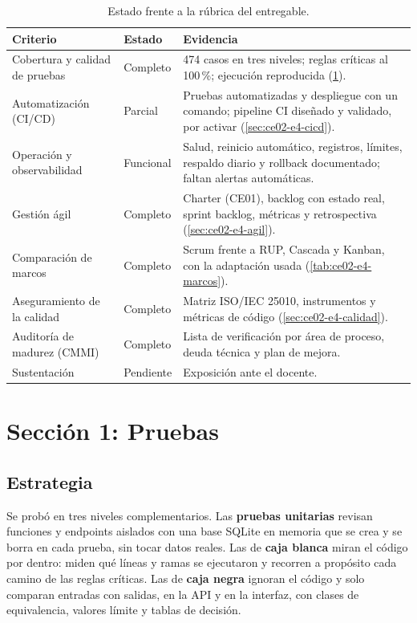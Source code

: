 \begin{table}[H]
\centering
\caption{Estado frente a la rúbrica del entregable.}
\label{tab:ce02-e4-rubrica}
\small
\begin{tabularx}{\textwidth}{L{4.2cm}L{2.2cm}X}
\toprule
\textbf{Criterio} & \textbf{Estado} & \textbf{Evidencia} \\
\midrule
Cobertura y calidad de pruebas & Completo & 474 casos en tres niveles; reglas críticas al 100\,\%; ejecución reproducida (\cref{sec:ce02-e4-pruebas}). \\
Automatización (CI/CD) & Parcial & Pruebas automatizadas y despliegue con un comando; pipeline CI diseñado y validado, por activar (\cref{sec:ce02-e4-cicd}). \\
Operación y observabilidad & Funcional & Salud, reinicio automático, registros, límites, respaldo diario y rollback documentado; faltan alertas automáticas. \\
Gestión ágil & Completo & Charter (CE01), backlog con estado real, sprint backlog, métricas y retrospectiva (\cref{sec:ce02-e4-agil}). \\
Comparación de marcos & Completo & Scrum frente a RUP, Cascada y Kanban, con la adaptación usada (\cref{tab:ce02-e4-marcos}). \\
Aseguramiento de la calidad & Completo & Matriz ISO/IEC 25010, instrumentos y métricas de código (\cref{sec:ce02-e4-calidad}). \\
Auditoría de madurez (CMMI) & Completo & Lista de verificación por área de proceso, deuda técnica y plan de mejora. \\
Sustentación & Pendiente & Exposición ante el docente. \\
\bottomrule
\end{tabularx}
\end{table}

\section{Sección 1: Pruebas}
\label{sec:ce02-e4-pruebas}

\subsection{Estrategia}

Se probó en tres niveles complementarios. Las \textbf{pruebas unitarias} revisan funciones y
endpoints aislados con una base SQLite en memoria que se crea y se borra en cada prueba, sin
tocar datos reales. Las de \textbf{caja blanca} miran el código por dentro: miden qué líneas y
ramas se ejecutaron y recorren a propósito cada camino de las reglas críticas. Las de
\textbf{caja negra} ignoran el código y solo comparan entradas con salidas, en la API y en la
interfaz, con clases de equivalencia, valores límite y tablas de decisión.

